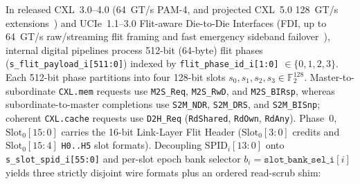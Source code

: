 \documentclass[11pt,letterpaper]{article}
\theoremstyle{spectralthm}
\begin{document}
In released \mbox{CXL~3.0--4.0} (64~GT/s PAM-4, and projected \mbox{CXL~5.0} 128~GT/s extensions~\cite{cxl2025spec, dassharma2024cxl}) and \mbox{UCIe~1.1--3.0} Flit-aware Die-to-Die Interfaces (FDI, up to 64~GT/s raw/streaming flit framing and fast emergency sideband failover~\cite{ucie2025spec30}), internal digital pipelines process 512-bit (64-byte) flit phases (\texttt{s\_flit\_payload\_i[511:0]}) indexed by \texttt{flit\_phase\_id\_i[1:0]} $\in \{0,1,2,3\}$. Each 512-bit phase partitions into four 128-bit slots $s_0, s_1, s_2, s_3 \in \mathbb{F}_2^{128}$. Master-to-subordinate \texttt{CXL.mem} requests use \texttt{M2S\_Req}, \texttt{M2S\_RwD}, and \texttt{M2S\_BIRsp}, whereas subordinate-to-master completions use \texttt{S2M\_NDR}, \texttt{S2M\_DRS}, and \texttt{S2M\_BISnp}; coherent \texttt{CXL.cache} requests use \texttt{D2H\_Req} (\texttt{RdShared}, \texttt{RdOwn}, \texttt{RdAny}). Phase~0, $\mathrm{Slot}_0[15:0]$ carries the 16-bit Link-Layer Flit Header ($\mathrm{Slot}_0[3:0]$ credits and $\mathrm{Slot}_0[15:4]$ \texttt{H0..H5} slot formats). Decoupling $\mathrm{SPID}_i[13:0]$ onto \texttt{s\_slot\_spid\_i[55:0]} and per-slot epoch bank selector $b_i = \texttt{slot\_bank\_sel\_i}[i]$ yields three strictly disjoint wire formats plus an ordered read-scrub shim:
\end{document}
